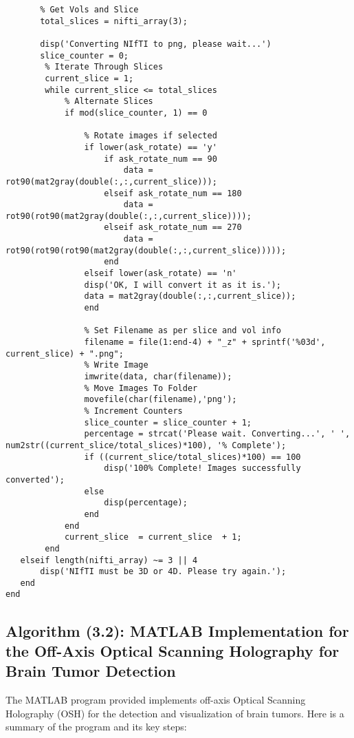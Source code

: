 \begin{appendices}
\begin{lstlisting}
       % Get Vols and Slice
       total_slices = nifti_array(3);

       disp('Converting NIfTI to png, please wait...')
       slice_counter = 0;
        % Iterate Through Slices
        current_slice = 1;
        while current_slice <= total_slices
            % Alternate Slices
            if mod(slice_counter, 1) == 0

                % Rotate images if selected
                if lower(ask_rotate) == 'y'
                    if ask_rotate_num == 90
                        data = rot90(mat2gray(double(:,:,current_slice)));
                    elseif ask_rotate_num == 180
                        data = rot90(rot90(mat2gray(double(:,:,current_slice))));
                    elseif ask_rotate_num == 270
                        data = rot90(rot90(rot90(mat2gray(double(:,:,current_slice)))));
                    end
                elseif lower(ask_rotate) == 'n'
                disp('OK, I will convert it as it is.');
                data = mat2gray(double(:,:,current_slice));
                end

                % Set Filename as per slice and vol info
                filename = file(1:end-4) + "_z" + sprintf('%03d', current_slice) + ".png";
                % Write Image
                imwrite(data, char(filename));
                % Move Images To Folder
                movefile(char(filename),'png');
                % Increment Counters
                slice_counter = slice_counter + 1;
                percentage = strcat('Please wait. Converting...', ' ', num2str((current_slice/total_slices)*100), '% Complete');
                if ((current_slice/total_slices)*100) == 100
                    disp('100% Complete! Images successfully converted');
                else
                    disp(percentage);
                end
            end
            current_slice  = current_slice  + 1;
        end
   elseif length(nifti_array) ~= 3 || 4
       disp('NIfTI must be 3D or 4D. Please try again.');
   end
end
\end{lstlisting}
\subsection{Algorithm (3.2): MATLAB Implementation for the Off-Axis Optical Scanning Holography for Brain Tumor Detection}
The MATLAB program provided implements off-axis Optical Scanning Holography (OSH) for the detection and visualization of brain tumors. Here is a summary of the program and its key steps:


\end{appendices}
